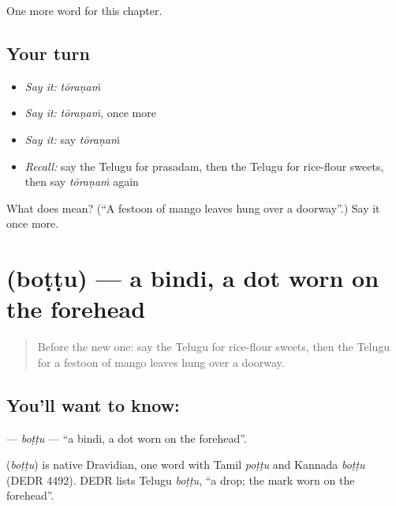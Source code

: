 \begin{grammarlens}[title={What you've built}]
One more word for this chapter.
\end{grammarlens}

\subsection*{Your turn}
\begin{itemize}
\raggedright
  \item \emph{Say it:} \emph{tōraṇaṁ}
  \item \emph{Say it:} \emph{tōraṇaṁ}, once more
  \item \emph{Say it:} say \emph{tōraṇaṁ}
  \item \emph{Recall:} say the Telugu for prasadam, then the Telugu for rice-flour sweets, then say \emph{tōraṇaṁ} again
\end{itemize}

\begin{tcolorbox}[breakable,colback=teal!4,colframe=teal!35!black,title={Before you move on}]
What does  mean? (\textquotedblleft{}A festoon of mango leaves hung over a doorway\textquotedblright{}.) Say it once more.
\end{tcolorbox}
\section[\texorpdfstring{\te{బొట్టు} (boṭṭu)}{బొట్టు (boṭṭu)}]{ (boṭṭu) — a bindi, a dot worn on the forehead}

\label{lesson:TE-C188-bottu}



\begin{quote}
Before the new one: say the Telugu for rice-flour sweets, then the Telugu for a festoon of mango leaves hung over a doorway.
\end{quote}

\subsection*{You'll want to know: }
\textbf{} — \emph{boṭṭu} — \textquotedblleft{}a bindi, a dot worn on the forehead\textquotedblright{}.

\begin{cousinweb}
\textbf{} (\emph{boṭṭu}) is native Dravidian, one word with Tamil \emph{poṭṭu} and Kannada \emph{boṭṭu} (DEDR 4492). DEDR lists Telugu \emph{boṭṭu}, \textquotedblleft{}a drop; the mark worn on the forehead\textquotedblright{}.
\end{cousinweb}

